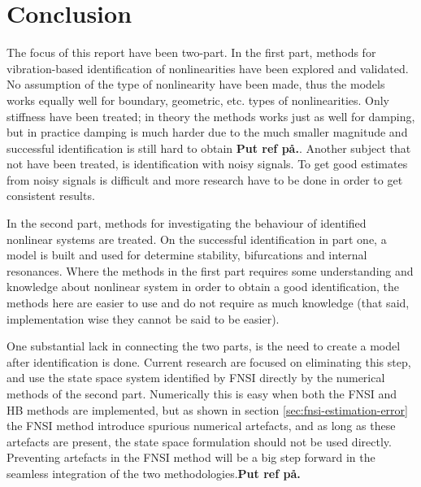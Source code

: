 \chapter{Conclusion}
\label{cha:conclusion}

The focus of this report have been two-part. In the first part, methods for
vibration-based identification of nonlinearities have been explored and
validated. No assumption of the type of nonlinearity have been made, thus the
models works equally well for boundary, geometric, etc. types of nonlinearities.
Only stiffness have been treated; in theory the methods works just as well for
damping, but in practice damping is much harder due to the much smaller
magnitude and successful identification is still hard to obtain \textbf{Put ref
  på.}. Another subject that not have been treated, is identification with noisy
signals. To get good estimates from noisy signals is difficult and more research
have to be done in order to get consistent results.

In the second part, methods for investigating the behaviour of identified
nonlinear systems are treated. On the successful identification in part one, a
model is built and used for determine stability, bifurcations and internal
resonances. Where the methods in the first part requires some understanding and
knowledge about nonlinear system in order to obtain a good identification, the
methods here are easier to use and do not require as much knowledge (that said,
implementation wise they cannot be said to be easier).

One substantial lack in connecting the two parts, is the need to create a model
after identification is done. Current research are focused on eliminating this
step, and use the state space system identified by FNSI directly by the
numerical methods of the second part. Numerically this is easy when both the
FNSI and HB methods are implemented, but as shown in section
\ref{sec:fnsi-estimation-error} the FNSI method introduce spurious numerical
artefacts, and as long as these artefacts are present, the state space
formulation should not be used directly. Preventing artefacts in the FNSI method
will be a big step forward in the seamless integration of the two
methodologies.\textbf{Put ref på.}


